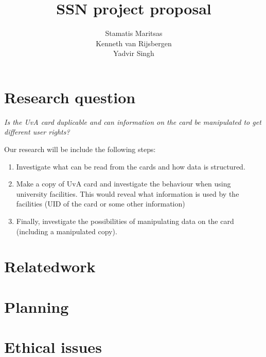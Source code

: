 \documentclass[11pt]{article}
\title{\textbf{SSN project proposal}}
\author{Stamatis Maritsas\\
		Kenneth van Rijsbergen\\
		Yadvir Singh}
\date{}
\begin{document}
\maketitle


\section{Research question}


\begin{framed}
\noindent \textit{Is the UvA card duplicable and can information on the card be manipulated to get different user rights?}
\end{framed}
Our research will be include the following steps:

\begin{enumerate}
\item{Investigate what can be read from the cards and how data is structured.}
\item{Make a copy of UvA card and investigate the behaviour when using university facilities. This would
reveal what information is used by the facilities (UID of the card or some other information)}
\item{Finally, investigate the possibilities of manipulating data on the card (including a manipulated copy).}
\end{enumerate}

\clearpage



\section{Relatedwork}


\section{Planning}


\section{Ethical issues}
\end{document}
